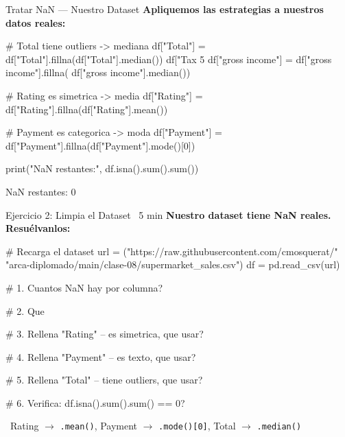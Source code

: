 \documentclass[aspectratio=169, 11pt]{beamer}
\begin{document}
\begin{frame}[fragile,shrink=28]{Tratar NaN --- Nuestro Dataset}
  \vspace{-6pt}
  {\footnotesize\color{arcaDark}\bfseries Apliquemos las estrategias a nuestros datos reales:}

  \vspace{4pt}
  \begin{pyblock}
# Total tiene outliers -> mediana
df["Total"] = df["Total"].fillna(df["Total"].median())
df["Tax 5%
df["gross income"] = df["gross income"].fillna(
    df["gross income"].median())

# Rating es simetrica -> media
df["Rating"] = df["Rating"].fillna(df["Rating"].mean())

# Payment es categorica -> moda
df["Payment"] = df["Payment"].fillna(df["Payment"].mode()[0])

print("NaN restantes:", df.isna().sum().sum())
  \end{pyblock}

  \vspace{2pt}
  \begin{outputblock}[minted options={fontsize=\scriptsize, breaklines}]
NaN restantes: 0
  \end{outputblock}
\end{frame}

\begin{frame}[fragile,shrink=28]{Ejercicio 2: Limpia el Dataset \hfill
    {\normalsize\color{arcaRed}\faClock\ 5 min}}
  \vspace{-6pt}
  {\footnotesize\color{arcaDark}\bfseries
    Nuestro dataset tiene NaN reales. Resuélvanlos:}

  \vspace{4pt}
  \begin{pyblock}
# Recarga el dataset
url = ("https://raw.githubusercontent.com/cmosquerat/"
       "arca-diplomado/main/clase-08/supermarket_sales.csv")
df = pd.read_csv(url)

# 1. Cuantos NaN hay por columna?

# 2. Que %

# 3. Rellena "Rating" -- es simetrica, que usar?

# 4. Rellena "Payment" -- es texto, que usar?

# 5. Rellena "Total" -- tiene outliers, que usar?

# 6. Verifica: df.isna().sum().sum() == 0?
  \end{pyblock}

  \vspace{4pt}
  {\scriptsize\color{textMuted}
    \faLightbulb\ Rating $\to$ \texttt{.mean()}, \quad
    Payment $\to$ \texttt{.mode()[0]}, \quad
    Total $\to$ \texttt{.median()}}
\end{frame}
\end{document}
